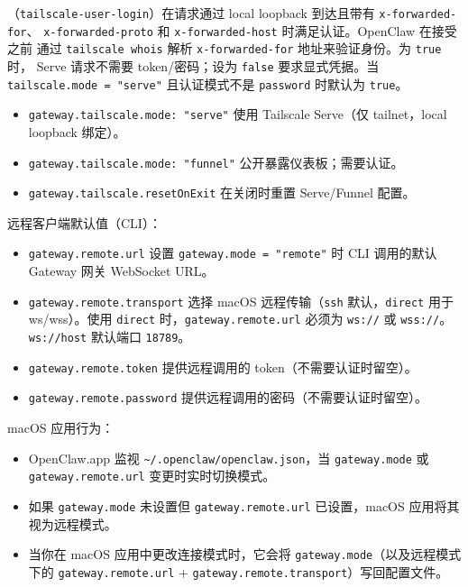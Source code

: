 （\texttt{tailscale-user-login}）在请求通过 local loopback 到达且带有 \texttt{x-forwarded-for}、
\texttt{x-forwarded-proto} 和 \texttt{x-forwarded-host} 时满足认证。OpenClaw 在接受之前
通过 \texttt{tailscale whois} 解析 \texttt{x-forwarded-for} 地址来验证身份。为 \texttt{true} 时，
Serve 请求不需要 token/密码；设为 \texttt{false} 要求显式凭据。当
\texttt{tailscale.mode = "serve"} 且认证模式不是 \texttt{password} 时默认为 \texttt{true}。
\begin{itemize}
  \item \texttt{gateway.tailscale.mode: "serve"} 使用 Tailscale Serve（仅 tailnet，local loopback 绑定）。
  \item \texttt{gateway.tailscale.mode: "funnel"} 公开暴露仪表板；需要认证。
  \item \texttt{gateway.tailscale.resetOnExit} 在关闭时重置 Serve/Funnel 配置。
\end{itemize}


远程客户端默认值（CLI）：

\begin{itemize}
  \item \texttt{gateway.remote.url} 设置 \texttt{gateway.mode = "remote"} 时 CLI 调用的默认 Gateway 网关 WebSocket URL。
  \item \texttt{gateway.remote.transport} 选择 macOS 远程传输（\texttt{ssh} 默认，\texttt{direct} 用于 ws/wss）。使用 \texttt{direct} 时，\texttt{gateway.remote.url} 必须为 \texttt{ws://} 或 \texttt{wss://}。\texttt{ws://host} 默认端口 \texttt{18789}。
  \item \texttt{gateway.remote.token} 提供远程调用的 token（不需要认证时留空）。
  \item \texttt{gateway.remote.password} 提供远程调用的密码（不需要认证时留空）。
\end{itemize}


macOS 应用行为：

\begin{itemize}
  \item OpenClaw.app 监视 \texttt{\textasciitilde{}/.openclaw/openclaw.json}，当 \texttt{gateway.mode} 或 \texttt{gateway.remote.url} 变更时实时切换模式。
  \item 如果 \texttt{gateway.mode} 未设置但 \texttt{gateway.remote.url} 已设置，macOS 应用将其视为远程模式。
  \item 当你在 macOS 应用中更改连接模式时，它会将 \texttt{gateway.mode}（以及远程模式下的 \texttt{gateway.remote.url} + \texttt{gateway.remote.transport}）写回配置文件。
\end{itemize}


